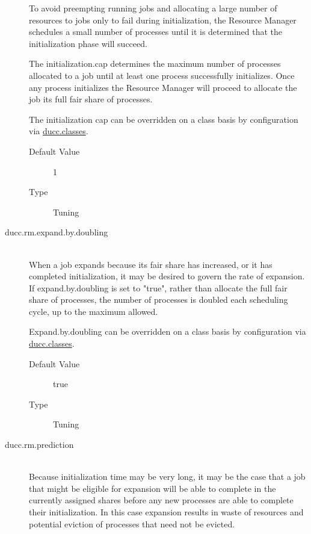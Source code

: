 \begin{description}
          To avoid preempting running jobs and allocating a large number of resources to jobs only 
          to fail during initialization, the Resource Manager schedules a small number of processes 
          until it is determined that the initialization phase will succeed. 
          
          The initialization.cap determines the maximum number of processes allocated to a job 
          until at least one process successfully initializes. Once any process initializes the Resource 
          Manager will proceed to allocate the job its full fair share of processes. 
          
          The initialization cap can be overridden on a class basis by configuration via           
          \hyperref[sec:ducc.classes]{ducc.classes}.

          \begin{description}
            \item[Default Value] 1
            \item[Type] Tuning 
          \end{description}
          

        \item[ducc.rm.expand.by.doubling] \hfill \\
          When a job expands because its fair share has increased, or it has completed initialization, 
          it may be desired to govern the rate of expansion. If expand.by.doubling is set to "true", 
          rather than allocate the full fair share of processes, the number of processes is doubled 
          each scheduling cycle, up to the maximum allowed. 

          Expand.by.doubling can be overridden on a class basis by configuration via 
          \hyperref[sec:ducc.classes]{ducc.classes}.

          \begin{description}
            \item[Default Value] true 
            \item[Type] Tuning 
          \end{description}
          

        \item[ducc.rm.prediction] \hfill \\
          Because initialization time may be very long, it may be the case that a job that might be 
          eligible for expansion will be able to complete in the currently assigned shares before any 
          new processes are able to complete their initialization. In this case expansion results in 
          waste of resources and potential eviction of processes that need not be evicted. 
          

\end{description}
